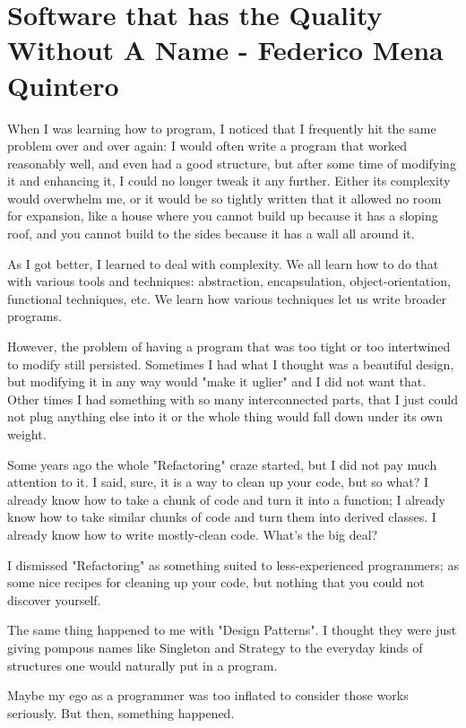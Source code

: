 \chapter{Software that has the Quality Without A Name - Federico Mena Quintero}
When I was learning how to program, I noticed that I frequently hit the same problem over and over again:  I would often write a program that worked reasonably well, and even had a good structure, but after some time of modifying it and enhancing it, I could no longer tweak it any further.  Either its complexity would overwhelm me, or it would be so tightly written that it allowed no room for expansion, like a house where you cannot build up because it has a sloping roof, and you cannot build to the sides because it has a wall all around it.

As I got better, I learned to deal with complexity.  We all learn how to do that with various tools and techniques:  abstraction, encapsulation, object-orientation, functional techniques, etc.  We learn how various techniques let us write broader programs.

However, the problem of having a program that was too tight or too intertwined to modify still persisted.  Sometimes I had what I thought was a beautiful design, but modifying it in any way would "make it uglier" and I did not want that.  Other times I had something with so many interconnected parts, that I just could not plug anything else into it or the whole thing would fall down under its own weight.

Some years ago the whole "Refactoring" craze started, but I did not pay much attention to it.  I said, sure, it is a way to clean up your code, but so what?  I already know how to take a chunk of code and turn it into a function; I already know how to take similar chunks of code and turn them into derived classes.  I already know how to write mostly-clean code.  What's the big deal?

I dismissed "Refactoring" as something suited to less-experienced programmers; as some nice recipes for cleaning up your code, but nothing that you could not discover yourself.

The same thing happened to me with "Design Patterns".  I thought they were just giving pompous names like Singleton and Strategy to the everyday kinds of structures one would naturally put in a program.

Maybe my ego as a programmer was too inflated to consider those works seriously.  But then, something happened.

